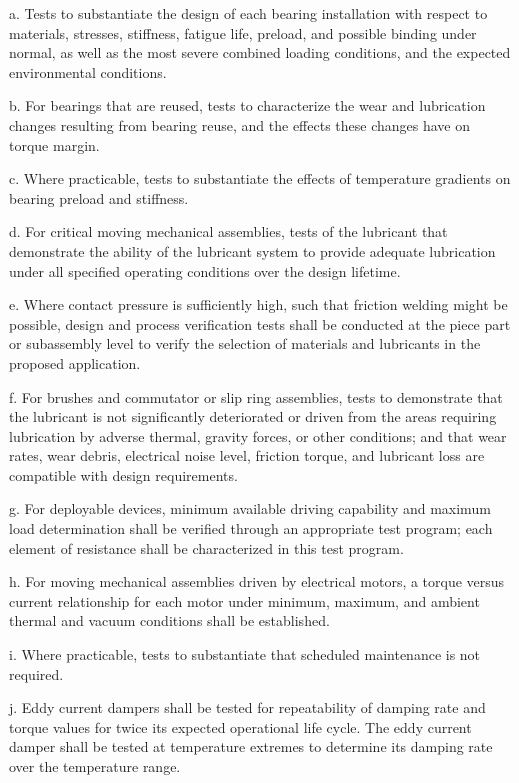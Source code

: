 \documentclass[12pt]{article}
\begin{document}
a. Tests to substantiate the design of each bearing installation with respect to materials, stresses, stiffness, fatigue life, preload, and possible binding under normal, as well as the most severe combined loading conditions, and the expected environmental conditions.

b. For bearings that are reused, tests to characterize the wear and lubrication changes resulting from bearing reuse, and the effects these changes have on torque margin.

c. Where practicable, tests to substantiate the effects of temperature gradients on bearing preload and stiffness.

d. For critical moving mechanical assemblies, tests of the lubricant that demonstrate the ability of the lubricant system to provide adequate lubrication under all specified operating conditions over the design lifetime.

e. Where contact pressure is sufficiently high, such that friction welding might be possible, design and process verification tests shall be conducted at the piece part or subassembly level to verify the selection of materials and lubricants in the proposed application.

f. For brushes and commutator or slip ring assemblies, tests to demonstrate that the lubricant is not significantly deteriorated or driven from the areas requiring lubrication by adverse thermal, gravity forces, or other conditions; and that wear rates, wear debris, electrical noise level, friction torque, and lubricant loss are compatible with design requirements.

g. For deployable devices, minimum available driving capability and maximum load determination shall be verified through an appropriate test program; each element of resistance shall be characterized in this test program.

h. For moving mechanical assemblies driven by electrical motors, a torque versus current relationship for each motor under minimum, maximum, and ambient thermal and vacuum conditions shall be established.

i. Where practicable, tests to substantiate that scheduled maintenance is not required.

j. Eddy current dampers shall be tested for repeatability of damping rate and torque values for twice its expected operational life cycle. 
The eddy current damper shall be tested at temperature extremes to determine its damping rate over the temperature range.
\end{document}
